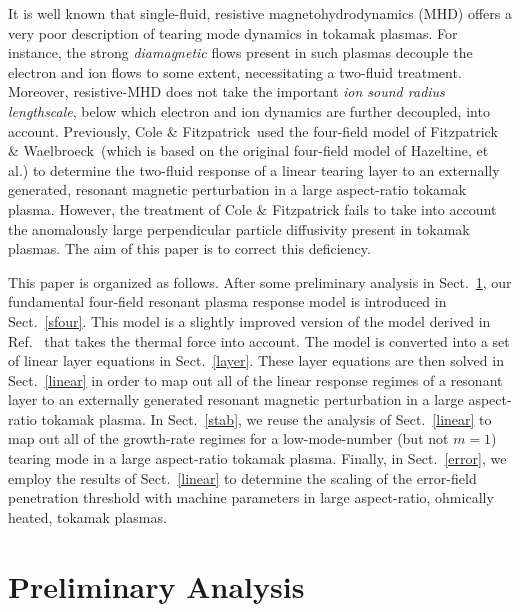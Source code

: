 \documentclass[12pt,prb,aps]{revtex4-1}
\begin{document}
It is well known that single-fluid, resistive magnetohydrodynamics (MHD) offers a very poor description of
tearing mode dynamics in tokamak plasmas. 
For instance, the strong {\em diamagnetic}\/ flows present in such plasmas decouple the electron and ion flows to some extent,
necessitating a two-fluid treatment.\cite{ara} Moreover, resistive-MHD does not take  the important {\em ion sound radius lengthscale}, below which electron and ion dynamics are further decoupled, 
into account.\cite{drake,wal} Previously, Cole \& Fitzpatrick\,\cite{cole} used the four-field model
of Fitzpatrick \& Waelbroeck\,\cite{fw} (which is based on the original four-field model of Hazeltine, et al.\cite{haz}) 
to determine the two-fluid response of a linear tearing layer to an externally generated, 
resonant magnetic perturbation  in a large aspect-ratio tokamak plasma. However, the treatment of Cole \& Fitzpatrick fails to take into account the
 anomalously large perpendicular  particle diffusivity  present in tokamak plasmas. The
aim of this paper is to correct this deficiency. 

This paper is organized as follows. After some preliminary analysis in Sect.~\ref{sect1}, our fundamental four-field resonant
plasma response model is introduced in Sect.~\ref{sfour}. This model is a slightly improved version of the model derived in Ref.~ that takes the thermal force into account. The model is converted into a set of linear layer equations in
Sect.~\ref{layer}. These layer equations are then solved in Sect.~\ref{linear} in order to map out all of the linear response regimes
of a resonant layer to an externally generated resonant magnetic perturbation in a large aspect-ratio tokamak plasma. In Sect.~\ref{stab}, we reuse the analysis of Sect.~\ref{linear} to map out all
of the growth-rate regimes for a low-mode-number (but not $m=1$) tearing mode in a large aspect-ratio tokamak plasma. Finally,
in Sect.~\ref{error}, we employ the results of Sect.~\ref{linear} to determine the scaling of the error-field penetration threshold with machine parameters
 in large aspect-ratio, ohmically heated, tokamak plasmas. 

\section{Preliminary Analysis}\label{sect1}
\end{document}
